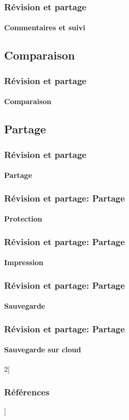 \documentclass[xcolor=table]{beamer}
\begin{document}
\begin{frame}
\frametitle{Révision et partage}
\framesubtitle{Commentaires et suivi}

\end{frame}

\subsection{Comparaison}

\begin{frame}
\frametitle{Révision et partage}
\framesubtitle{Comparaison}

\end{frame}

\subsection{Partage}

\begin{frame}
\frametitle{Révision et partage}
\framesubtitle{Partage}


\end{frame}

\begin{frame}
\frametitle{Révision et partage: Partage}
\framesubtitle{Protection}

\end{frame}

\begin{frame}
\frametitle{Révision et partage: Partage}
\framesubtitle{Impression}

\end{frame}

\begin{frame}
\frametitle{Révision et partage: Partage}
\framesubtitle{Sauvegarde}

\end{frame}

\begin{frame}
\frametitle{Révision et partage: Partage}
\framesubtitle{Sauvegarde sur cloud}


\end{frame}

\nocite{*}
%
% 

\begin{multicols*}{2}[\frametitle{Références}]%
	\tiny
	
	
\end{multicols*}
\end{document}
